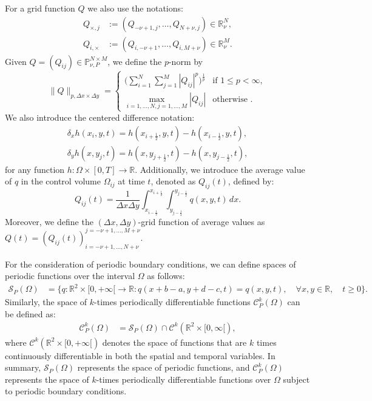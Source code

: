 For a grid function $Q$ we also use the notations:
\begin{align*}
Q_{\times,j} &:= (Q_{-\nu+1,j}, \ldots, Q_{N+\nu,j}) \in \mathbb{R}^N_{\nu},\\
Q_{i,\times} &:= (Q_{i,-\nu+1}, \ldots, Q_{i,M+\nu}) \in \mathbb{R}^M_{\nu}.
\end{align*}
Given $Q = (Q_{ij})\in \mathbb{P}^{N \times M}_{\nu, P}$, we define the $p$-norm by
\begin{equation}
	\label{chp-adv2d-pnorm}
	\|Q\|_{p,\Delta x \times \Delta y}=
	\begin{cases}
		\bigg( \sum_{i=1}^{N} \sum_{j=1}^{M}|Q_{ij}|^p \bigg)^{\frac{1}{p}} & \text{if } 1\leq p < \infty,\\
		\max_{i=1, \ldots, N,j=1,\ldots,M}{|Q_{ij}|} & \text{otherwise }.
	\end{cases}
\end{equation}
We also introduce the centered difference notation:
\begin{align}
	\label{sec-adv2d:eq6}
	\delta_x {h}(x_i,y, t) = 
	{h}(x_{i+\frac{1}{2}}, y, t) - 
	{h}(x_{i-\frac{1}{2}}, y, t), \\
	\delta_y {h}(x, y_j,t) = 
    {h}(x, y_{j+\frac{1}{2}},t) - 
    {h}(x, y_{j-\frac{1}{2}},t),
\end{align}
for any function $h: \Omega \times [0,T] \to \mathbb{R}$.
Additionally, we introduce the average value of $q$ in the control volume
$\Omega_{ij}$ at time $t$, denoted as ${Q}_{ij}(t)$, defined by:
\begin{equation}
	\label{chp-adv2d-sec1-not2}
	{Q}_{ij}(t) = \frac{1}{\Delta x \Delta y}
	\int_{x_{i-\frac{1}{2}}}^{x_{i+\frac{1}{2}}} \int_{y_{j-\frac{1}{2}}}^{y_{j-\frac{1}{2}}} {q}(x,y,t) \,dx.
\end{equation}
Moreover, we define the $(\Delta x, \Delta y)$-grid function of average values as $Q(t) = (Q_{ij}(t))_{i=-\nu+1,\ldots,N+\nu}^{j=-\nu+1,\ldots,M+\nu}$.

For the consideration of periodic boundary conditions, we can define spaces of periodic functions over 
the interval $\Omega$ as follows:
\begin{align*}
	\mathcal{S}_P(\Omega) &= \{q:\mathbb{R}^2\times[0,+\infty[\to \mathbb{R}: q(x+b-a,y+d-c,t)=q(x,y,t), \quad \forall x,y \in \mathbb{R}, \quad t\geq0\}.
\end{align*}
Similarly, the space of $k$-times periodically differentiable functions $\mathcal{C}_P^k(\Omega)$ can be defined as:
\begin{align*}
	\mathcal{C}_P^k(\Omega) &= \mathcal{S}_P(\Omega) \cap \mathcal{C}^k(\mathbb{R}^2\times[0,\infty[),
\end{align*}
where $\mathcal{C}^k(\mathbb{R}^2\times[0,+\infty[)$ denotes the space of functions that are $k$ 
times continuously differentiable in both the spatial and temporal variables.
In summary, $\mathcal{S}_P(\Omega)$ represents the space of periodic functions, and $\mathcal{C}_P^k(\Omega)$
represents the space of $k$-times periodically differentiable functions over $\Omega$ subject to periodic boundary conditions.

